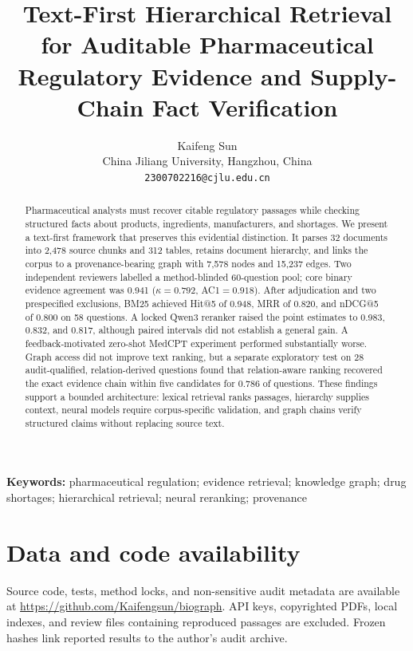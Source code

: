 \documentclass[11pt]{article}
\title{Text-First Hierarchical Retrieval for Auditable Pharmaceutical Regulatory Evidence and Supply-Chain Fact Verification}
\author{
  Kaifeng Sun\\
  China Jiliang University, Hangzhou, China\\
  \texttt{2300702216@cjlu.edu.cn}
}
\date{}
\begin{document}
\maketitle

\begin{abstract}
Pharmaceutical analysts must recover citable regulatory passages while checking structured facts about products, ingredients, manufacturers, and shortages. We present a text-first framework that preserves this evidential distinction. It parses 32 documents into 2,478 source chunks and 312 tables, retains document hierarchy, and links the corpus to a provenance-bearing graph with 7,578 nodes and 15,237 edges. Two independent reviewers labelled a method-blinded 60-question pool; core binary evidence agreement was 0.941 ($\kappa=0.792$, AC1$=0.918$). After adjudication and two prespecified exclusions, BM25 achieved Hit@5 of 0.948, MRR of 0.820, and nDCG@5 of 0.800 on 58 questions. A locked Qwen3 reranker raised the point estimates to 0.983, 0.832, and 0.817, although paired intervals did not establish a general gain. A feedback-motivated zero-shot MedCPT experiment performed substantially worse. Graph access did not improve text ranking, but a separate exploratory test on 28 audit-qualified, relation-derived questions found that relation-aware ranking recovered the exact evidence chain within five candidates for 0.786 of questions. These findings support a bounded architecture: lexical retrieval ranks passages, hierarchy supplies context, neural models require corpus-specific validation, and graph chains verify structured claims without replacing source text.
\end{abstract}

\noindent\textbf{Keywords:} pharmaceutical regulation; evidence retrieval; knowledge graph; drug shortages; hierarchical retrieval; neural reranking; provenance











\section*{Data and code availability}
Source code, tests, method locks, and non-sensitive audit metadata are available at \url{https://github.com/Kaifengsun/biograph}. API keys, copyrighted PDFs, local indexes, and review files containing reproduced passages are excluded. Frozen hashes link reported results to the author's audit archive.
\end{document}
